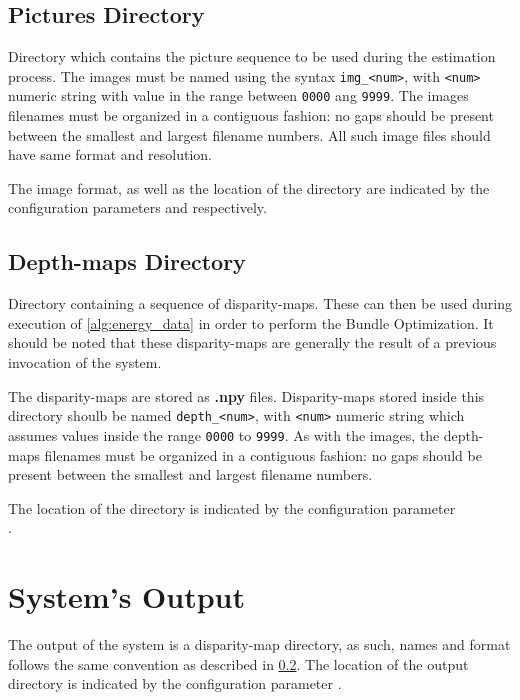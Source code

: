 \subsection{Pictures Directory}
Directory which contains the picture sequence to be used during the estimation process.
The images must be named using the syntax \texttt{img\_<num>}, with \texttt{<num>} numeric string with value in the range between \texttt{0000} ang \texttt{9999}. The images filenames must be organized in a 
contiguous fashion: no gaps should be present between the smallest and largest filename numbers.
All such image files should have same format and resolution.\\
\begin{Note}
The image format, as well as the location of the directory are indicated by the configuration parameters
 and respectively. 
\end{Note}

\subsection{Depth-maps Directory}\label{sec:depthmaps_dir}
Directory containing a sequence of disparity-maps. These can then be used during execution of \cref{alg:energy_data} in order to perform the Bundle Optimization. It should be noted that these disparity-maps are generally the result of a previous invocation of the system.

The disparity-maps are stored as \textbf{.npy} files.
Disparity-maps stored inside this directory shoulb be named  \texttt{depth\_<num>}, with  \texttt{<num>} numeric string which assumes values inside the range \texttt{0000} to \texttt{9999}. As with the images, the depth-maps filenames must be organized in a contiguous fashion: no gaps should be present between the smallest and largest filename numbers.\\
\begin{Note}
The location of the directory is indicated by the configuration parameter \\ .
\end{Note}

\section{System's Output}
The output of the system is a disparity-map directory, as such, names and format follows the same convention as described in \cref{sec:depthmaps_dir}. The location of the output directory is indicated by the configuration parameter .

